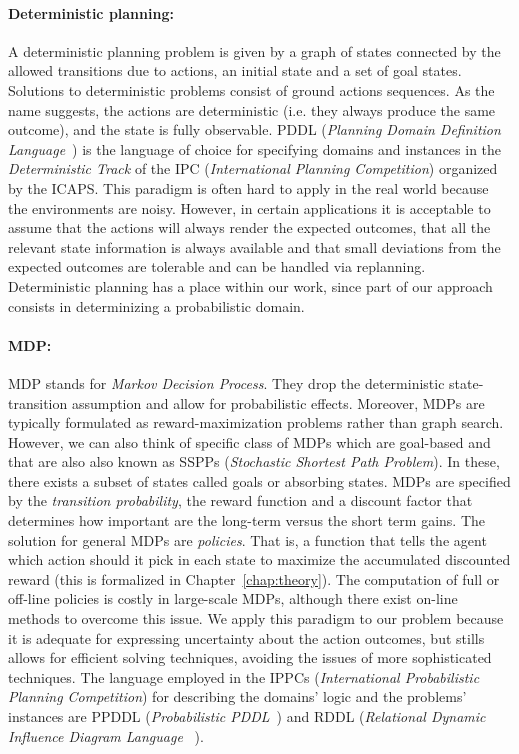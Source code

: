 \documentclass[../root.tex]{subfiles}
\begin{document}
\paragraph{Deterministic planning:} A deterministic planning problem
is given by a graph of states connected by the allowed transitions due
to actions, an initial state and a set
of goal states. Solutions to deterministic problems
consist of ground actions sequences. As the name suggests,
the actions are deterministic (i.e.
they always produce the same outcome), and the state is fully
observable.
PDDL (\emph{Planning Domain Definition Language}~\cite{fox2003pddl2})
is the language of choice for specifying domains and instances in
the \emph{Deterministic Track} of the
IPC (\emph{International Planning Competition}) organized by the
ICAPS. This paradigm is often hard to apply in
the real world because the environments are noisy.
However, in certain applications it is acceptable to assume
that the actions will always render the expected outcomes,
that all the relevant state information is always available and
that small deviations from the expected outcomes are tolerable
and can be handled via replanning. Deterministic planning
has a place within our work, since part of our approach consists
in determinizing a probabilistic domain.

\paragraph{MDP:} MDP stands for \emph{Markov Decision Process}. They
drop the deterministic state-transition assumption and allow for
probabilistic effects. Moreover, MDPs are typically formulated as
reward-maximization problems rather than graph search. However,
we can also think of specific class of MDPs which are goal-based
and that are also also known as SSPPs (\emph{Stochastic Shortest
Path Problem}). In these, there exists a subset of states called
goals or absorbing states. MDPs are specified by the \emph{transition
probability}, the reward function and a discount factor that determines
how important are the long-term versus the short term gains.
The solution for general MDPs are \emph{policies}. That is,
a function that tells the agent which action should it
pick in each state to maximize the accumulated discounted reward
(this is formalized in Chapter~\ref{chap:theory}). The computation of
full or off-line policies is costly in large-scale MDPs,
although there exist on-line methods to overcome this issue.
We apply this paradigm to our problem because it is adequate
for expressing uncertainty about the action outcomes, but stills allows for
efficient solving techniques, avoiding the issues of more sophisticated
techniques. The language
employed in the IPPCs (\emph{International Probabilistic Planning %
Competition}) for describing the domains' logic and the problems'
instances are PPDDL (\emph{Probabilistic PDDL}~\cite{younes2004ppddl1})
and RDDL (\emph{Relational Dynamic Influence Diagram Language}~%
\cite{sanner2010relational}).
\end{document}
